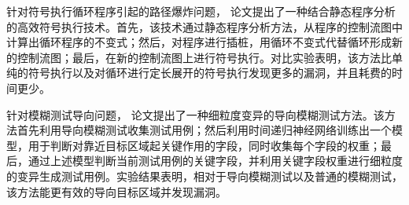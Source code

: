 \begin{cabstract}
针对符号执行循环程序引起的路径爆炸问题，
论文提出了一种结合静态程序分析的高效符号执行技术。首先，该技术通过静态程序分析方法，从程序的控制流图中计算出循环程序的不变式；然后，对程序进行插桩，用循环不变式代替循环形成新的控制流图；最后，在新的控制流图上进行符号执行。对比实验表明，该方法比单纯的符号执行以及对循环进行定长展开的符号执行发现更多的漏洞，并且耗费的时间更少。

针对模糊测试导向问题，
论文提出了一种细粒度变异的导向模糊测试方法。该方法首先利用导向模糊测试收集测试用例；然后利用时间递归神经网络训练出一个模型，用于判断对靠近目标区域起关键作用的字段，同时收集每个字段的权重；最后，通过上述模型判断当前测试用例的关键字段，并利用关键字段权重进行细粒度的变异生成测试用例。实验结果表明，相对于导向模糊测试以及普通的模糊测试，该方法能更有效的导向目标区域并发现漏洞。


\end{cabstract}

